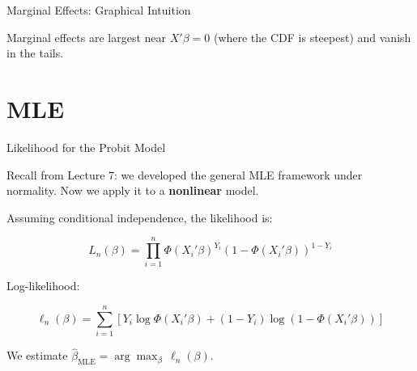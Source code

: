 \documentclass[aspectratio=169, handout, t]{beamer}
\numberwithin{equation}{section}
\begin{document}

\begin{frame}{Marginal Effects: Graphical Intuition}

\begin{center}
\end{center}

\pause

Marginal effects are largest near $X'\beta = 0$ (where the CDF is steepest) and vanish in the tails.

\end{frame}

\section{MLE}

\begin{frame}{Likelihood for the Probit Model}

Recall from Lecture 7: we developed the general MLE framework under normality. Now we apply it to a \textbf{nonlinear} model.

\pause

\bigskip

Assuming conditional independence, the likelihood is:

\[
L_n(\beta)
=
\prod_{i=1}^n
\Phi(X_i'\beta)^{Y_i}
\left(1-\Phi(X_i'\beta)\right)^{1-Y_i}
\]

\pause

Log-likelihood:

\[
\ell_n(\beta)
=
\sum_{i=1}^n
\left[
Y_i \log \Phi(X_i'\beta)
+
(1-Y_i)\log\left(1-\Phi(X_i'\beta)\right)
\right]
\]

\pause

We estimate $\hat\beta_{\text{MLE}} = \arg\max_\beta \, \ell_n(\beta)$.

\end{frame}
\end{document}
